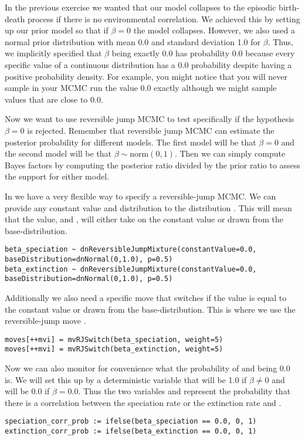 In the previous exercise we wanted that our model collapses to the episodic birth-death process if there is no environmental correlation.
We achieved this by setting up our prior model so that if $\beta=0$ the model collapses.
However, we also used a normal prior distribution with mean 0.0 and standard deviation 1.0 for $\beta$.
Thus, we implicitly specified that $\beta$ being exactly 0.0 has probability 0.0 because every specific value of a continuous distribution has a 0.0 probability despite having a positive probability density.
For example, you might notice that you will never sample in your MCMC run the value 0.0 exactly although we might sample values that are close to 0.0.

Now we want to use reversible jump MCMC to test specifically if the hypothesis $\beta=0$ is rejected.
Remember that reversible jump MCMC can estimate the posterior probability for different models.
The first model will be that $\beta=0$ and the second model will be that $\beta \sim \text{norm}(0,1)$.
Then we can simply compute Bayes factors by computing the posterior ratio divided by the prior ratio to assess the support for either model.

In \RevBayes we have a very flexible way to specify a reversible-jump MCMC.
We can provide any constant value and distribution to the distribution .
This will mean that the value,  and , will either take on the constant value or drawn from the base-distribution.
{\tt \begin{snugshade*}
\begin{lstlisting}
beta_speciation ~ dnReversibleJumpMixture(constantValue=0.0, baseDistribution=dnNormal(0,1.0), p=0.5)
beta_extinction ~ dnReversibleJumpMixture(constantValue=0.0, baseDistribution=dnNormal(0,1.0), p=0.5)
\end{lstlisting}
\end{snugshade*}}
Additionally we also need a specific move that switches if the value is equal to the constant value or drawn from the base-distribution.
This is where we use the reversible-jump move .
{\tt \begin{snugshade*}
\begin{lstlisting}moves[++mvi] = mvRJSwitch(beta_speciation, weight=5)
moves[++mvi] = mvRJSwitch(beta_extinction, weight=5)
\end{lstlisting}
\end{snugshade*}}
Now we can also monitor for convenience what the probability of  and  being 0.0 is.
We will set this up by a deterministic variable that will be 1.0 if $\beta \neq 0$ and will be 0.0 if $\beta = 0.0$.
Thus the two variables  and  represent the probability that there is a correlation between the speciation rate or the extinction rate and \COO.
{\tt \begin{snugshade*}
\begin{lstlisting}
speciation_corr_prob := ifelse(beta_speciation == 0.0, 0, 1)
extinction_corr_prob := ifelse(beta_extinction == 0.0, 0, 1)
\end{lstlisting}
\end{snugshade*}}

